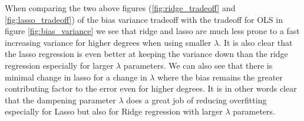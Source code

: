 \documentclass[12pt]{article}
\begin{document}
When comparing the two above figures (\ref{fig:ridge_tradeoff} and \ref{fig:lasso_tradeoff}) of the bias variance tradeoff with the tradeoff for OLS in figure \ref{fig:bias_variance} we see that ridge and lasso are much less prone to a fast increasing variance for higher degrees when using smaller $\lambda$. It is also clear that the lasso regression is even better at keeping the variance down than the ridge regression especially for larger $\lambda$ parameters. We can also see that there is minimal change in lasso for a change in $\lambda$ where the bias remains the greater contributing factor to the error even for higher degrees. It is in other words clear that the dampening parameter $\lambda$ does a great job of reducing overfitting especially for Lasso but also for Ridge regression with larger $\lambda$ parameters.
\end{document}
